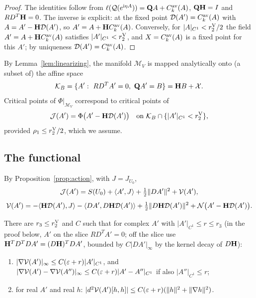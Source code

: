 \begin{proof}
The identities follow from $\ell(\mathcal Q(e^{\mathrm i\eta A}))=\mathbf Q A+C^{\rm av}_k(A)$, $\mathbf Q\mathbf H=I$ and $RD^T\mathbf H=0$. The inverse is explicit: at the fixed point $\mathcal D(A')=C^{\rm av}_k(A)$ with $A=A'-\mathbf H\mathcal D(A')$, so $A'=A+\mathbf H C^{\rm av}_k(A)$. Conversely, for $|A|_{C^1}<r_2^{\rm V}/2$ the field $A'=A+\mathbf H C^{\rm av}_k(A)$ satisfies $|A'|_{C^1}<r_2^{\rm V}$, and $X=C^{\rm av}_k(A)$ is a fixed point for this $A'$; by uniqueness $\mathcal D(A')=C^{\rm av}_k(A)$.
\end{proof}

By Lemma~\ref{lem:linearizing}, the manifold $\mathcal M_V$ is mapped analytically onto (a subset of) the affine space
\[
\mathcal K_B=\{A':\ RD^TA'=0,\ \mathbf Q A'=B\}=\mathbf H B+\mathcal X .
\]
Critical points of $\Phi|_{\mathcal M_V}$ correspond to critical points of
\[
\mathcal J(A')=\Phi\big(A'-\mathbf H\mathcal D(A')\big)\quad\text{on }\mathcal K_B\cap\{|A'|_{C^1}<r_2^{\rm V}\},
\]
provided $\rho_1\le r_2^{\rm V}/2$, which we assume.

\subsection{The functional}\label{ss:26.2}

By Proposition~\ref{prop:action}, with $J=J_{U_0}$,
\begin{equation}\label{eq:F-expansion}
\mathcal J(A')=S(U_0)+\langle A',J\rangle+\tfrac12\|DA'\|^2+\mathcal V(A'),
\end{equation}
\[
\mathcal V(A')=-\langle \mathbf H\mathcal D(A'),J\rangle-\langle DA',D\mathbf H\mathcal D(A')\rangle+\tfrac12\|D\mathbf H\mathcal D(A')\|^2+\mathcal N\big(A'-\mathbf H\mathcal D(A')\big).
\]

\begin{lemma}\label{lem:V-bounds}
There are $r_3\le r_2^{\rm V}$ and $C$ such that for complex $A'$ with $|A'|_{C^1}\le r\le r_3$ (in the proof below, $A'$ on the slice $RD^TA'=0$; off the slice use $\mathbf H^TD^TDA'=(D\mathbf H)^TDA'$, bounded by $C|DA'|_\infty$ by the kernel decay of $D\mathbf H$):
\begin{enumerate}[label=(\alph*)]
\item $|\nabla\mathcal V(A')|_\infty\le C(\varepsilon+r)|A'|_{C^1}$, and $|\nabla\mathcal V(A')-\nabla\mathcal V(A'')|_\infty\le C(\varepsilon+r)|A'-A''|_{C^1}$ if also $|A''|_{C^1}\le r$;
\item for real $A'$ and real $h$: $|d^2\mathcal V(A')[h,h]|\le C(\varepsilon+r)(\|h\|^2+\|\nabla h\|^2)$.
\end{enumerate}
\end{lemma}

